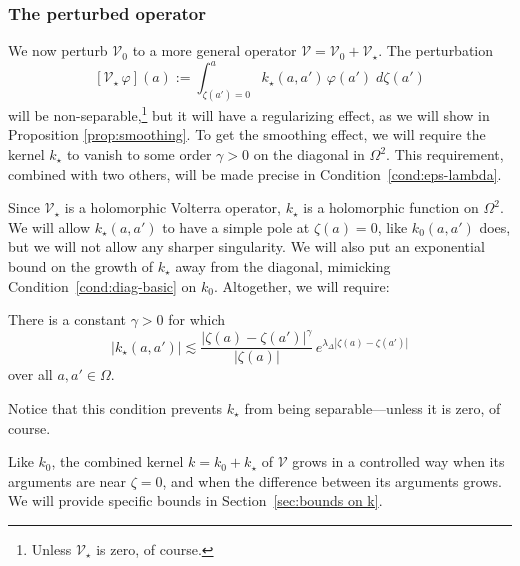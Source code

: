 \documentclass[final]{siamart220329}
\makeatletter
\newcommand{\condconst}[2]{\item[($\text{\textsc{#1}} \mid #2$)]\protected@edef\@currentlabel{$\text{\textsc{#1}} \mid #2$}}
\newcommand{\volterra}{\mathcal{V}}
\newcommand{\hardpart}{\mathcal{V}_0}
\newcommand{\softpart}{\mathcal{V}_\star}
\newcommand{\hardker}{k_0}
\newcommand{\softker}{k_\star}
\newcommand{\domain}{\Omega}
\newenvironment{revtwo}{\color{revred}}{\color{black}}
\newcommand{\revtwotext}[1]{\textcolor{revred}{#1}}
\newenvironment{revtwo}{}{}
\newcommand{\revtwotext}[1]{#1}
\makeatother
\begin{document}
\subsubsection{The perturbed operator}\label{setting:perturbed}

We now perturb $\hardpart$ to a more general operator $\volterra = \hardpart +\softpart$. \begin{revtwo}The perturbation
\[ [\softpart\,\varphi](a) := \int_{\zeta(a') = 0}^a \softker(a, a')\,\varphi(a')\;d\zeta(a') \]
will be non-separable,\end{revtwo}\footnote{Unless $\softpart$ is zero, of course.} but it will have a regularizing effect, as we will show in Proposition \ref{prop:smoothing}. To get the smoothing effect, we will require \revtwotext{the kernel $\softker$} to vanish to some order $\gamma > 0$ on the diagonal in $\domain^2$. This requirement, combined with two others, will be made precise in Condition~\eqref{cond:eps-lambda}.

Since $\softpart$ is a holomorphic Volterra operator, $\softker$ is a holomorphic function on $\domain^2$. We will allow $\softker(a, a')$ to have a simple pole at $\zeta(a) = 0$, like $\hardker(a, a')$ does, but we will not allow any sharper singularity. We will also put an exponential bound on the growth of $\softker$ away from the diagonal, mimicking Condition~\eqref{cond:diag-basic} on $\hardker$. Altogether, we will require:
\begin{conditions}
\condconst{diag$_\star$}{\gamma, \lambda_\Delta}\label{cond:eps-lambda} There is a constant $\gamma > 0$ for which
\[ |\softker(a, a')| \lesssim\frac{|\zeta(a)-\zeta(a')|^\gamma}{|\zeta(a)|}\,e^{\lambda_\Delta|\zeta(a)-\zeta(a')|}\]
over all $a, a' \in \domain$.
\end{conditions}
Notice that this condition prevents $\softker$ from being separable---unless it is zero, of course.

Like $\hardker$, the combined kernel $k = \hardker + \softker$ of $\volterra$ grows in a controlled way when its arguments are near $\zeta = 0$, and when the difference between its arguments grows. We will provide specific bounds in Section~\ref{sec:bounds on k}. 
\end{document}
